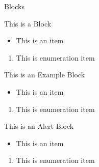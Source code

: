 \documentclass{beamer}
\begin{document}
\begin{frame}[shrink]{Blocks}
	\begin{block}{This is a Block}
		\begin{itemize}
			\item This is an item
		\end{itemize}
		\begin{enumerate}
			\item This is enumeration item
		\end{enumerate}
	\end{block}
	\begin{exampleblock}{This is an Example Block}
		\begin{itemize}
			\item This is an item
		\end{itemize}
		\begin{enumerate}
			\item This is enumeration item
		\end{enumerate}
	\end{exampleblock}
	\begin{alertblock}{This is an Alert Block}
		\begin{itemize}
			\item This is an item
		\end{itemize}
		\begin{enumerate}
			\item This is enumeration item
		\end{enumerate}
	\end{alertblock}
\end{frame}
\end{document}
